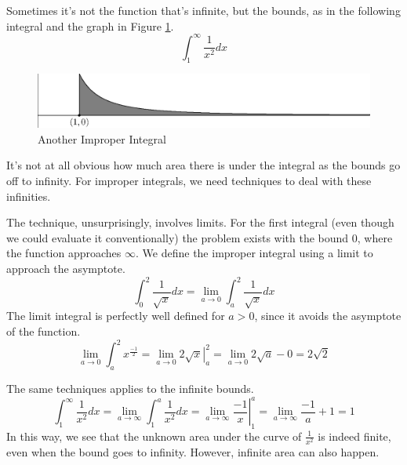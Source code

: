 \documentclass[fleqn]{report}
\begin{document}
\begin{example}
Sometimes it's not the function that's infinite, but the
bounds, as in the following integral and the graph in Figure
\ref{figure-improper-integral2}.
\begin{equation*}
\int_1^\infty \frac{1}{x^2} dx
\end{equation*}

\begin{figure}[t]
\centering
\includegraphics[width=12cm]{figure09.eps}
\caption{Another Improper Integral}
\label{figure-improper-integral2}
\end{figure}

It's not at all obvious how much area there is under the
integral as the bounds go off to infinity. For improper
integrals, we need techniques to deal with these infinities.

The technique, unsurprisingly, involves limits. For the first
integral (even though we could evaluate it conventionally) the
problem exists with the bound $0$, where the function
approaches $\infty$. We define the improper integral using a
limit to approach the asymptote.
\begin{equation*}
\int_0^2 \frac{1}{\sqrt{x}} dx = \lim_{a \rightarrow 0}
\int_a^2 \frac{1}{\sqrt{x}} dx
\end{equation*}
The limit integral is perfectly well defined for $a>0$, since
it avoids the asymptote of the function. 
\begin{equation*}
\lim_{a \rightarrow 0} \int_a^2 x^\frac{-1}{2} = \lim_{a
\rightarrow 0} \left. 2\sqrt{x} \right|_a^2 = \lim_{a
\rightarrow 0} 2 \sqrt{a} - 0 = 2 \sqrt{2}
\end{equation*}
\end{example}

\begin{example}
The same techniques applies to the infinite bounds.
\begin{equation*}
\int_1^\infty \frac{1}{x^2} dx = \lim_{a \rightarrow \infty}
\int_1^a \frac{1}{x^2} dx = \lim_{a \rightarrow \infty}
\left. \frac{-1}{x} \right|_1^a = \lim_{a \rightarrow \infty}
\frac{-1}{a} + 1 = 1
\end{equation*}
In this way, we see that the unknown area under the curve of
$\frac{1}{x^2}$ is indeed finite, even when the bound goes to
infinity. However, infinite area can also happen. 
\end{example}
\end{document}
